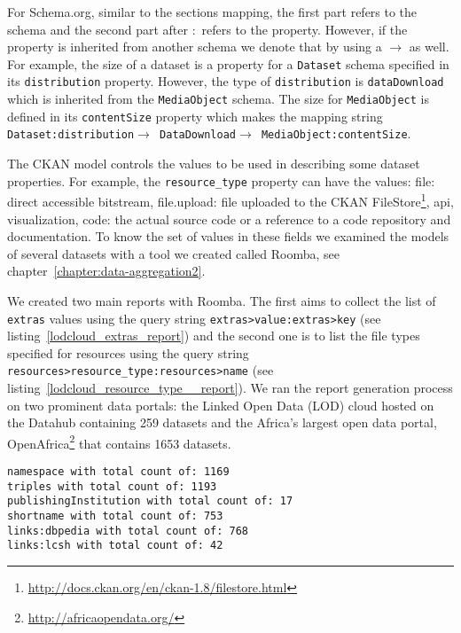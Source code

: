 For Schema.org, similar to the sections mapping, the first part refers to the schema and the second part after $:$ refers to the property. However, if the property is inherited from another schema we denote that by using a $\rightarrow$ as well. For example, the size of a dataset is a property for a \texttt{Dataset} schema specified in its \texttt{distribution} property. However, the type of \texttt{distribution} is \texttt{dataDownload} which is inherited from the \texttt{MediaObject} schema. The size for \texttt{MediaObject} is defined in its \texttt{contentSize} property which makes the mapping string \texttt{Dataset:distribution$\rightarrow$ DataDownload$\rightarrow$ MediaObject:contentSize}.

The CKAN model controls the values to be used in describing some dataset properties. For example, the \texttt{resource\_type} property can have the values: file: direct accessible bitstream, file.upload: file uploaded to the CKAN FileStore\footnote{\url{http://docs.ckan.org/en/ckan-1.8/filestore.html}}, api, visualization, code: the actual source code or a reference to a code repository and documentation. To know the set of values in these fields we examined the models of several datasets with a tool we created called Roomba, see chapter~\ref{chapter:data-aggregation2}.

We created two main reports with Roomba. The first aims to collect the list of \texttt{extras} values using the query string \texttt{extras>value:extras>key} (see listing~\ref{lodcloud_extras_report}) and the second one is to list the file types specified for resources using the query string \texttt{resources>resource\_type:resources>name} (see listing~\ref{lodcloud_resource_type__report}). We ran the report generation process on two prominent data portals: the Linked Open Data (LOD) cloud hosted on the Datahub containing 259 datasets and the Africa's largest open data portal, OpenAfrica\footnote{\url{http://africaopendata.org/}} that contains 1653 datasets.

\begin{lstlisting}
namespace with total count of: 1169
triples with total count of: 1193
publishingInstitution with total count of: 17
shortname with total count of: 753
links:dbpedia with total count of: 768
links:lcsh with total count of: 42
\end{lstlisting}

